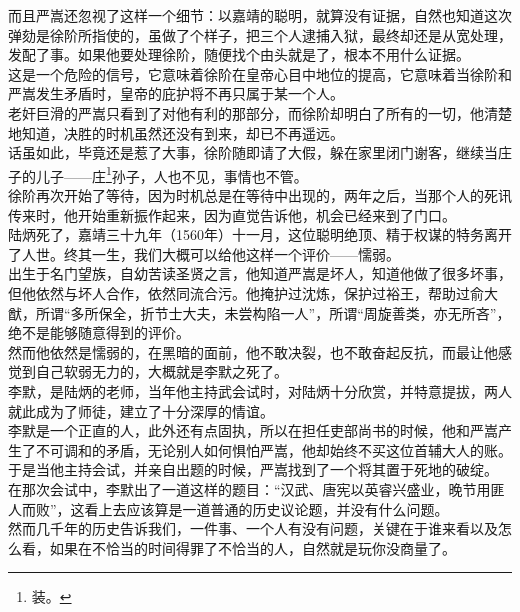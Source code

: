 \begin{multicols}{\theparacolNo}
而且严嵩还忽视了这样一个细节：以嘉靖的聪明，就算没有证据，自然也知道这次弹劾是徐阶所指使的，虽做了个样子，把三个人逮捕入狱，最终却还是从宽处理，发配了事。如果他要处理徐阶，随便找个由头就是了，根本不用什么证据。\\

这是一个危险的信号，它意味着徐阶在皇帝心目中地位的提高，它意味着当徐阶和严嵩发生矛盾时，皇帝的庇护将不再只属于某一个人。\\

老奸巨滑的严嵩只看到了对他有利的那部分，而徐阶却明白了所有的一切，他清楚地知道，决胜的时机虽然还没有到来，却已不再遥远。\\

话虽如此，毕竟还是惹了大事，徐阶随即请了大假，躲在家里闭门谢客，继续当庄子的儿子——庄\footnote{装。}孙子，人也不见，事情也不管。\\

徐阶再次开始了等待，因为时机总是在等待中出现的，两年之后，当那个人的死讯传来时，他开始重新振作起来，因为直觉告诉他，机会已经来到了门口。\\

陆炳死了，嘉靖三十九年（1560年）十一月，这位聪明绝顶、精于权谋的特务离开了人世。终其一生，我们大概可以给他这样一个评价——懦弱。\\

出生于名门望族，自幼苦读圣贤之言，他知道严嵩是坏人，知道他做了很多坏事，但他依然与坏人合作，依然同流合污。他掩护过沈炼，保护过裕王，帮助过俞大猷，所谓“多所保全，折节士大夫，未尝构陷一人”，所谓“周旋善类，亦无所吝”，绝不是能够随意得到的评价。\\

然而他依然是懦弱的，在黑暗的面前，他不敢决裂，也不敢奋起反抗，而最让他感觉到自己软弱无力的，大概就是李默之死了。\\

李默，是陆炳的老师，当年他主持武会试时，对陆炳十分欣赏，并特意提拔，两人就此成为了师徒，建立了十分深厚的情谊。\\

李默是一个正直的人，此外还有点固执，所以在担任吏部尚书的时候，他和严嵩产生了不可调和的矛盾，无论别人如何惧怕严嵩，他却始终不买这位首辅大人的账。于是当他主持会试，并亲自出题的时候，严嵩找到了一个将其置于死地的破绽。\\

在那次会试中，李默出了一道这样的题目：“汉武、唐宪以英睿兴盛业，晚节用匪人而败”，这看上去应该算是一道普通的历史议论题，并没有什么问题。\\

然而几千年的历史告诉我们，一件事、一个人有没有问题，关键在于谁来看以及怎么看，如果在不恰当的时间得罪了不恰当的人，自然就是玩你没商量了。\\


\end{multicols}
